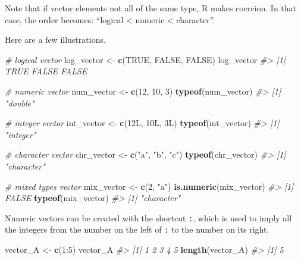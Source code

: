 \documentclass[]{book}
\newenvironment{Shaded}{}{}
\newcommand{\CommentTok}[1]{\textcolor[rgb]{0.38,0.63,0.69}{\textit{#1}}}
\newcommand{\DecValTok}[1]{\textcolor[rgb]{0.25,0.63,0.44}{#1}}
\newcommand{\KeywordTok}[1]{\textcolor[rgb]{0.00,0.44,0.13}{\textbf{#1}}}
\newcommand{\NormalTok}[1]{#1}
\newcommand{\OperatorTok}[1]{\textcolor[rgb]{0.40,0.40,0.40}{#1}}
\newcommand{\OtherTok}[1]{\textcolor[rgb]{0.00,0.44,0.13}{#1}}
\newcommand{\StringTok}[1]{\textcolor[rgb]{0.25,0.44,0.63}{#1}}
\theoremstyle{definition}
\theoremstyle{definition}
\theoremstyle{definition}
\theoremstyle{remark}
\begin{document}
Note that if vector elements not all of the same type, R makes coercion.
In that case, the order becomes: ``logical \textless{} numeric
\textless{} character''.

Here are a few illustrations.

\begin{Shaded}
\begin{Highlighting}[]
\CommentTok{# logical vector}
\NormalTok{log_vector <-}\StringTok{ }\KeywordTok{c}\NormalTok{(}\OtherTok{TRUE}\NormalTok{, }\OtherTok{FALSE}\NormalTok{, }\OtherTok{FALSE}\NormalTok{)}
\NormalTok{log_vector}
\CommentTok{#> [1]  TRUE FALSE FALSE}

\CommentTok{# numeric vector}
\NormalTok{num_vector <-}\StringTok{ }\KeywordTok{c}\NormalTok{(}\DecValTok{12}\NormalTok{, }\DecValTok{10}\NormalTok{, }\DecValTok{3}\NormalTok{)}
\KeywordTok{typeof}\NormalTok{(num_vector)}
\CommentTok{#> [1] "double"}

\CommentTok{# integer vector}
\NormalTok{int_vector <-}\StringTok{ }\KeywordTok{c}\NormalTok{(12L, 10L, 3L)}
\KeywordTok{typeof}\NormalTok{(int_vector)}
\CommentTok{#> [1] "integer"}


\CommentTok{# character vector}
\NormalTok{chr_vector <-}\StringTok{ }\KeywordTok{c}\NormalTok{(}\StringTok{"a"}\NormalTok{, }\StringTok{"b"}\NormalTok{, }\StringTok{"c"}\NormalTok{)}
\KeywordTok{typeof}\NormalTok{(chr_vector)}
\CommentTok{#> [1] "character"}

\CommentTok{# mixed types vector}
\NormalTok{mix_vector <-}\StringTok{ }\KeywordTok{c}\NormalTok{(}\DecValTok{2}\NormalTok{, }\StringTok{"a"}\NormalTok{)}
\KeywordTok{is.numeric}\NormalTok{(mix_vector)}
\CommentTok{#> [1] FALSE}
\KeywordTok{typeof}\NormalTok{(mix_vector)}
\CommentTok{#> [1] "character"}
\end{Highlighting}
\end{Shaded}

Numeric vectors can be created with the shortcut \texttt{:}, which is
used to imply all the integers from the number on the left of \texttt{:}
to the number on its right.

\begin{Shaded}
\begin{Highlighting}[]
\NormalTok{vector_A <-}\StringTok{ }\KeywordTok{c}\NormalTok{(}\DecValTok{1}\OperatorTok{:}\DecValTok{5}\NormalTok{)}
\NormalTok{vector_A}
\CommentTok{#> [1] 1 2 3 4 5}
\KeywordTok{length}\NormalTok{(vector_A)}
\CommentTok{#> [1] 5}
\end{Highlighting}
\end{Shaded}
\end{document}
